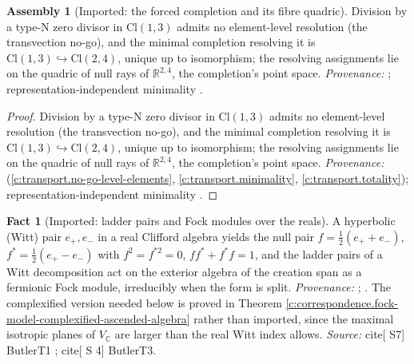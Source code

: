 \documentclass[11pt]{article}
\theoremstyle{definition}
\newtheorem{fact}[theorem]{Fact}
\newtheorem{assembled}[theorem]{Assembly}
\theoremstyle{plain}
\providecommand{\C}{}\renewcommand{\C}{\mathbb{C}}
\providecommand{\Cl}{}\renewcommand{\Cl}{\mathrm{Cl}}
\providecommand{\R}{}\renewcommand{\R}{\mathbb{R}}
\begin{document}
\begin{assembled}[Imported: the forced completion and its fibre quadric]\label{c:correspondence.imported-forced-completion-fibre-quadric}
Division by a type-N zero divisor in $\Cl(1,3)$ admits no element-level resolution (the transvection no-go), and the minimal completion resolving it is $\Cl(1,3) \hookrightarrow \Cl(2,4)$, unique up to isomorphism; the resolving assignments lie on the quadric of null rays of $\R^{2,4}$, the completion's point space. \emph{Provenance:} \cite[Thms.~4.2, 4.10, 4.13]{ButlerT1}; representation-independent minimality \cite[\S4.6]{ButlerT1}.
\end{assembled}
\begin{proof}
Division by a type-N zero divisor in $\Cl(1,3)$ admits no element-level resolution (the transvection no-go), and the minimal completion resolving it is $\Cl(1,3) \hookrightarrow \Cl(2,4)$, unique up to isomorphism; the resolving assignments lie on the quadric of null rays of $\R^{2,4}$, the completion's point space. \emph{Provenance:} \cite[Thms.~4.2, 4.10, 4.13]{ButlerT1} (\ref{c:transport.no-go-level-elements}, \ref{c:transport.minimality}, \ref{c:transport.totality}); representation-independent minimality \cite[\S4.6]{ButlerT1}.

\end{proof}

\begin{fact}[Imported: ladder pairs and Fock modules over the reals]\label{c:correspondence.imported-ladder-pairs-fock-modules-over}
A hyperbolic (Witt) pair $e_+, e_-$ in a real Clifford algebra yields the null pair $f = \tfrac12(e_+ + e_-)$, $f^* = \tfrac12(e_+ - e_-)$ with $f^2 = f^{*2} = 0$, $ff^* + f^*f = 1$, and the ladder pairs of a Witt decomposition act on the exterior algebra of the creation span as a fermionic Fock module, irreducibly when the form is split. \emph{Provenance:} \cite[\S7]{ButlerT1}; \cite[\S 4]{ButlerT3}. The complexified version needed below is proved in Theorem \ref{c:correspondence.fock-model-complexified-ascended-algebra} rather than imported, since the maximal isotropic planes of $V_\C$ are larger than the real Witt index allows.
\emph{Source:} cite[ S7] ButlerT1 ;  cite[ S 4] ButlerT3.
\end{fact}
\end{document}
